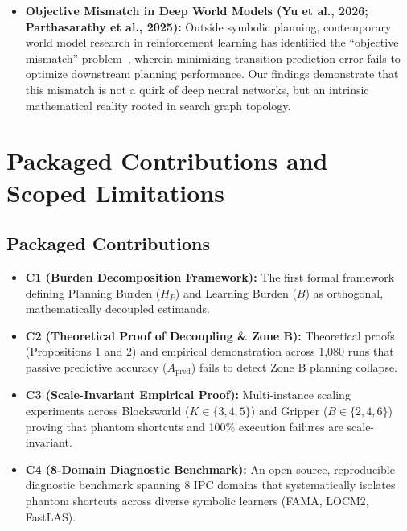 \documentclass[11pt,a4paper]{article}
\theoremstyle{definition}
\begin{document}
\begin{itemize}[leftmargin=*]
    \item \textbf{Objective Mismatch in Deep World Models (Yu et al., 2026; Parthasarathy et al., 2025):} Outside symbolic planning, contemporary world model research in reinforcement learning has identified the ``objective mismatch'' problem~\cite{yu2026objective, parthasarathy2025learning}, wherein minimizing transition prediction error fails to optimize downstream planning performance. Our findings demonstrate that this mismatch is not a quirk of deep neural networks, but an intrinsic mathematical reality rooted in search graph topology.
\end{itemize}

\section{Packaged Contributions and Scoped Limitations}

\subsection{Packaged Contributions}
\begin{itemize}[leftmargin=*]
    \item \textbf{C1 (Burden Decomposition Framework):} The first formal framework defining Planning Burden ($H_P$) and Learning Burden ($B$) as orthogonal, mathematically decoupled estimands.
    \item \textbf{C2 (Theoretical Proof of Decoupling \& Zone B):} Theoretical proofs (Propositions 1 and 2) and empirical demonstration across 1,080 runs that passive predictive accuracy ($A_{\text{pred}}$) fails to detect Zone B planning collapse.
    \item \textbf{C3 (Scale-Invariant Empirical Proof):} Multi-instance scaling experiments across Blocksworld ($K \in \{3,4,5\}$) and Gripper ($B \in \{2,4,6\}$) proving that phantom shortcuts and 100\% execution failures are scale-invariant.
    \item \textbf{C4 (8-Domain Diagnostic Benchmark):} An open-source, reproducible diagnostic benchmark spanning 8 IPC domains that systematically isolates phantom shortcuts across diverse symbolic learners (FAMA, LOCM2, FastLAS).
\end{itemize}
\end{document}
